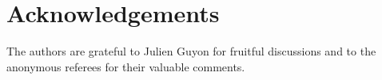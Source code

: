 \section*{Acknowledgements}

The authors are grateful to Julien Guyon for fruitful discussions and to the anonymous referees for their valuable comments.